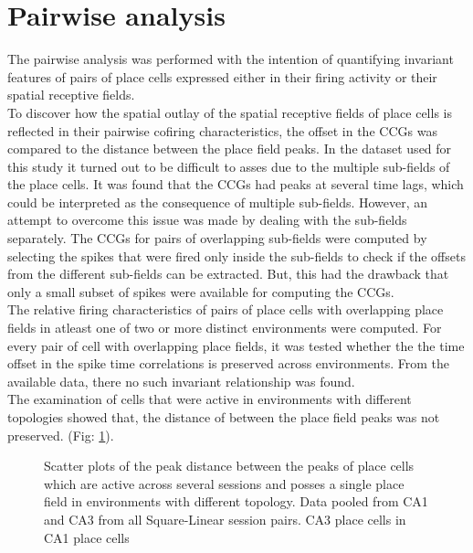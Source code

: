 \section{Pairwise analysis}
The pairwise analysis was performed with the intention of quantifying invariant features of pairs of place cells expressed either in their firing activity or their spatial receptive fields.\\ To discover how the spatial outlay of the spatial receptive fields of place cells is reflected in their pairwise cofiring characteristics, the offset in the CCGs was compared to the distance between the place field peaks. In the dataset used for this study it turned out to be difficult to asses due to the multiple sub-fields of the place cells. It was found that the CCGs had peaks at several time lags, which could be interpreted as the consequence of multiple sub-fields. However, an attempt to overcome this issue was made by dealing with the sub-fields separately.  The CCGs for pairs of overlapping sub-fields were computed by selecting the spikes that were fired only inside the sub-fields to check if the offsets from the different sub-fields can be extracted. But, this had the drawback that only a small subset of spikes were available for computing the CCGs. \\

The relative firing characteristics of pairs of place cells with overlapping place fields in atleast one of  two or more distinct environments were computed. For every pair of cell with overlapping place fields, it was tested whether the the time offset in the spike time correlations is preserved across environments. From the available data, there no such invariant relationship was found.  \\
The examination of cells that were active in environments with different topologies showed that, the distance of between the place field peaks was not preserved. (Fig: \ref{fig:pkDist}).



\begin{figure}[htb!]
\centering
{}
\caption[Place field Peak distances]{Scatter plots of the peak distance between the peaks of place cells which are active across several sessions and posses a single place field in environments with different topology. Data pooled from CA1 and CA3  from all Square-Linear session pairs.   CA3 place cells in   CA1 place cells }
\label{fig:pkDist}
\end{figure}

